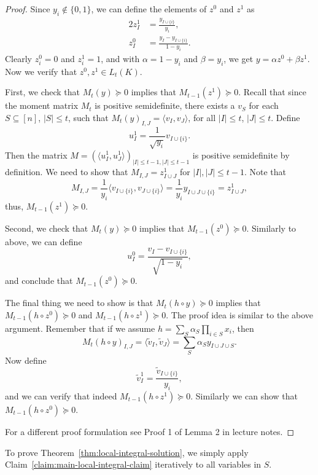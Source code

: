 \documentclass[a4paper,twoside,justified]{tufte-handout}
\begin{document}
\begin{proof}
  Since $y_i \notin \{0,1\}$, we can define the elements of $z^0$ and $z^1$ as
  \begin{alignat*}{2}
    z^1_I &= \frac{y_{I \cup \{i\}}}{y_i}, \\
    z^0_I &= \frac{y_I - y_{I \cup \{i\}}}{1-y_i}.
  \end{alignat*}
  Clearly $z^0_i=0$ and $z^1_i=1$, and with $\alpha = 1-y_i$ and $\beta=y_i$, we get $y=\alpha z^0 + \beta z^1$.
  Now we verify that $z^0, z^1 \in L_t(K)$.

  First, we check that $M_t(y) \succeq 0$ implies that $M_{t-1}(z^1) \succeq 0$.
  Recall that since the moment matrix $M_t$ is positive semidefinite,
  there exists a $v_S$ for each $S \subseteq [n]$, $|S| \le t$, 
  such that $M_t(y)_{I,J}=\langle v_I, v_J \rangle$, for all $|I| \le t$, $|J| \le t$.
  Define
  \[
  u^1_I = \frac{1}{\sqrt{y_i}} v_{I \cup \{i\}}.
  \]
  Then the matrix $M=(\langle u^1_I, u^1_J \rangle)_{|I| \le t-1, |J| \le t-1}$
  is positive semidefinite by definition. We need to show that $M_{I,J}=z^1_{I \cup J}$
  for $|I|,|J| \le t-1$. Note that
  \[
  M_{I,J} = \frac{1}{y_i} \langle v_{I \cup \{i\}}, v_{J \cup \{i\}} \rangle
  =\frac{1}{y_i} y_{I \cup J \cup \{i\}} = z^1_{I \cup J},
  \]
  thus, $M_{t-1}(z^1) \succeq 0$.

 Second, we check that $M_t(y) \succeq 0$ implies that $M_{t-1}(z^0) \succeq 0$. Similarly to above, we can define
  \[
  u^0_I = \frac{v_I - v_{I \cup \{i\}}}{\sqrt{1-y_i}},
  \]
  and conclude that $M_{t-1}(z^0) \succeq 0$.

  The final thing we need to show is that $M_t(h \circ y) \succeq 0$
  implies that $M_{t-1}(h \circ z^0) \succeq 0$ and $M_{t-1}(h \circ z^1) \succeq 0$.
  The proof idea is similar to the above argument.
  Remember that if we assume $h=\sum_S \alpha_S \prod_{i \in S} x_i$,
  then
  \[
  M_t(h \circ y)_{I,J} = \langle \tilde{v}_I, \tilde{v}_J \rangle 
  = \sum_S \alpha_S y_{I \cup J \cup S}.
  \]
  Now define 
  \[
  \tilde{v}^1_I = \frac{\tilde{v}_{I \cup \{i\}}}{y_i},
  \]
  and we can verify that indeed $M_{t-1}(h \circ z^1) \succeq 0$.
  Similarly we can show that $M_{t-1}(h \circ z^0) \succeq 0$.

For a different proof formulation see Proof 1 of Lemma 2 in lecture notes\cite{lasserresurvey2013}.
\end{proof}
To prove Theorem~\ref{thm:local-integral-solution}, we simply apply Claim~\ref{claim:main-local-integral-claim}
iteratively to all variables in $S$.
\end{document}
